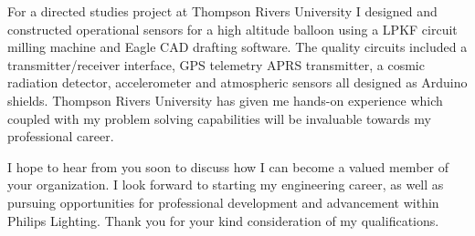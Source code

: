 \documentclass[11pt,a4paper]{moderncv} %
\begin{document}
 For a directed studies project at Thompson Rivers University I designed and constructed operational sensors for a high altitude balloon using a LPKF circuit milling machine and Eagle CAD drafting software. The quality circuits included a transmitter/receiver interface, GPS telemetry APRS transmitter, a cosmic radiation detector, accelerometer and atmospheric sensors all designed as Arduino shields. Thompson Rivers University has given me hands-on experience which coupled with my problem solving capabilities will be invaluable towards my professional career.

I hope to hear from you soon to discuss how I can become a valued member of your organization. I look forward to starting my engineering career, as well as pursuing opportunities for professional development and advancement within Philips Lighting. Thank you for your kind consideration of my qualifications.

\makeletterclosing %


\end{document}
